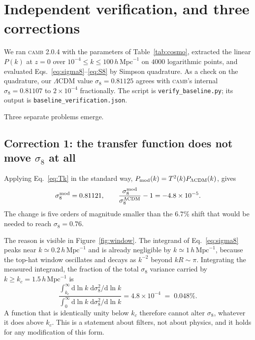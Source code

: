 \documentclass[11pt,a4paper]{article}
\newcommand{\hMpc}{h\,\mathrm{Mpc}^{-1}}
\newcommand{\LCDM}{\Lambda\mathrm{CDM}}
\begin{document}
\section{Independent verification, and three corrections}\label{sec:verify}

We ran \textsc{camb} 2.0.4 with the parameters of Table~\ref{tab:cosmo}, extracted
the linear $P(k)$ at $z=0$ over $10^{-4}\le k\le100\,\hMpc$ on $4000$ logarithmic
points, and evaluated Eqs.~\eqref{eq:sigma8}--\eqref{eq:S8} by Simpson quadrature.
As a check on the quadrature, our $\LCDM$ value $\sigma_8=0.81125$ agrees with
\textsc{camb}'s internal $\sigma_8=0.81107$ to $2\times10^{-4}$ fractionally.
The script is \texttt{verify\_baseline.py}; its output is
\texttt{baseline\_verification.json}.

Three separate problems emerge.

\subsection{Correction 1: the transfer function does not move \texorpdfstring{$\sigma_8$}{sigma8} at all}

Applying Eq.~\eqref{eq:Tk} in the standard way, $P_{\rm mod}(k)=T^2(k)P_{\LCDM}(k)$,
gives
\begin{equation}
\sigma_8^{\rm mod}=0.81121,
\qquad
\frac{\sigma_8^{\rm mod}}{\sigma_8^{\LCDM}}-1 = -4.8\times10^{-5}.
\end{equation}
The change is five orders of magnitude smaller than the $6.7\%$ shift that would be
needed to reach $\sigma_8=0.76$.

The reason is visible in Figure~\ref{fig:window}. The integrand of
Eq.~\eqref{eq:sigma8} peaks near $k\simeq0.2\,\hMpc$ and is already negligible by
$k\simeq1\,\hMpc$, because the top-hat window oscillates and decays as $k^{-2}$
beyond $kR\sim\pi$. Integrating the measured integrand, the fraction of the total
$\sigma_8$ variance carried by $k\ge k_c=1.5\,\hMpc$ is
\begin{equation}
\frac{\int_{k_c}^{\infty}\mathrm{d}\ln k\; \mathrm{d}\sigma_8^2/\mathrm{d}\ln k}
     {\int_{0}^{\infty}\mathrm{d}\ln k\; \mathrm{d}\sigma_8^2/\mathrm{d}\ln k}
= 4.8\times10^{-4} \;=\; 0.048\%.
\end{equation}
A function that is identically unity below $k_c$ therefore cannot alter $\sigma_8$,
whatever it does above $k_c$. This is a statement about filters, not about physics,
and it holds for any modification of this form.
\end{document}
